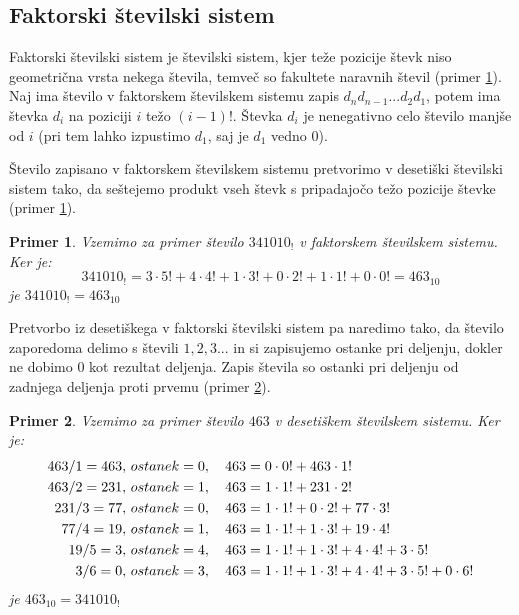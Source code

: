\documentclass[a4paper, 12pt]{book}
\newtheorem{primer}{Primer}[chapter]
\begin{document}
\subsection{ Faktorski številski sistem }

Faktorski številski sistem je številski sistem, kjer teže pozicije števk niso geometrična vrsta nekega števila, temveč so fakultete naravnih števil (primer \ref{primer_faktorski_stevilski_sistem1}). Naj ima število v faktorskem številskem sistemu zapis $d_nd_{n-1}...d_2d_1$, potem ima števka $d_i$ na poziciji $i$ težo $(i-1)!$. Števka $d_i$ je nenegativno celo število manjše od $i$ (pri tem lahko izpustimo $d_1$, saj je $d_1$ vedno $0$). 

Število zapisano v faktorskem številskem sistemu pretvorimo v desetiški številski sistem tako, da seštejemo produkt vseh števk s pripadajočo težo pozicije števke (primer \ref{primer_faktorski_stevilski_sistem1}).

\begin{primer}
\label{primer_faktorski_stevilski_sistem1}
    Vzemimo za primer število $341010_{!}$ v faktorskem številskem sistemu. Ker je:
    \[
        341010_{!} = 3 \cdot 5! + 4 \cdot 4! + 1 \cdot 3! + 0 \cdot 2! + 1 \cdot 1! + 0 \cdot 0! = 463_{10} 
    \]
    je $341010_{!} = 463_{10}$
\end{primer}

Pretvorbo iz desetiškega v faktorski številski sistem pa naredimo tako, da število zaporedoma delimo s števili $1, 2, 3...$ in si zapisujemo ostanke pri deljenju, dokler ne dobimo $0$ kot rezultat deljenja. Zapis števila so ostanki pri deljenju od zadnjega deljenja proti prvemu (primer \ref{primer_faktorski_stevilski_sistem2}). 

\begin{primer}
\label{primer_faktorski_stevilski_sistem2}
    Vzemimo za primer število $463$ v desetiškem številskem sistemu. Ker je:
    \begin{align}
        463 / 1 = 463,&\ ostanek = 0, \quad 463 = 0 \cdot 0! + 463 \cdot 1! \notag\\
        463 / 2 = 231,&\ ostanek = 1, \quad 463 = 1 \cdot 1! + 231 \cdot 2! \notag\\
        231 / 3 = 77,&\ ostanek = 0, \quad 463 = 1 \cdot 1! + 0 \cdot 2! + 77 \cdot 3!  \notag\\
        77 / 4 = 19,&\ ostanek = 1, \quad 463 = 1 \cdot 1! +  1 \cdot 3! + 19 \cdot 4! \notag\\
        19 / 5 = 3,&\ ostanek = 4, \quad 463 = 1 \cdot 1! + 1 \cdot 3! + 4 \cdot 4! + 3 \cdot 5! \notag\\
        3 / 6 = 0,&\ ostanek = 3, \quad 463 = 1 \cdot 1! + 1 \cdot 3! + 4 \cdot 4! + 3 \cdot 5! + 0 \cdot 6! \notag
    \end{align}
    je $463_{10} = 341010_{!}$
\end{primer}
\end{document}
